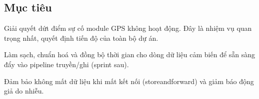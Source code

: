 \subsection*{Mục tiêu}
Giải quyết dứt điểm sự cố module GPS không hoạt động. Đây là nhiệm vụ quan trọng nhất, quyết định tiến độ của toàn bộ dự án.

Làm sạch, chuẩn hoá và đồng bộ thời gian cho dòng dữ liệu cảm biến để sẵn sàng đẩy vào pipeline truyền/ghi (sprint sau).

Đảm bảo không mất dữ liệu khi mất kết nối (store\text{-}and\text{-}forward) và giảm báo động giả do nhiễu.





